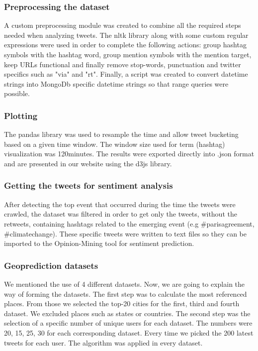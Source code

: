 \documentclass[12pt,svgnames]{report}
\begin{document}
\subsubsection*{Preprocessing the dataset}
A custom preprocessing module was created to combine all the required steps needed when analyzing tweets. The nltk \cite{nltk} library along with some custom regular expressions were used in order to complete the following actions: group hashtag symbols with the hashtag word, group mention symbols with the mention target, keep URLs functional and finally remove stop-words, punctuation and twitter specifics such as "via" and "rt". Finally, a script was created to convert datetime strings into MongoDb specific datetime strings so that range queries were possible.

\subsubsection*{Plotting}
The pandas \cite{pandas} library was used to resample the time and allow tweet bucketing based on a given time window. The window size used for term (hashtag) visualization was 120minutes. The results were exported directly into .json format and are presented in our website \cite{projectwebsite} using the d3js \cite{d3js} library.

\subsubsection*{Getting the tweets for sentiment analysis}
After detecting the top event that occurred during the time the tweets were crawled, the dataset was filtered in order to get only the tweets, without the retweets, containing hashtags related to the emerging event (e.g \#parisagreement, \#climatechange). These specific tweets were written to text files so they can be imported to the Opinion-Mining tool\cite{opinion} for sentiment prediction.

\subsubsection*{Geoprediction datasets}
We mentioned the use of 4 different datasets. Now, we are going to explain the way of forming the datasets. The first step was to calculate the most referenced places. From those we selected the top-20 cities for the first, third and fourth dataset. We excluded places such as states or countries. The second step was the selection of a specific number of unique users for each dataset. The numbers were 20, 15, 25, 30 for each corresponding dataset. Every time we picked the 200 latest tweets for each user. The algorithm was applied in every dataset.
\end{document}
